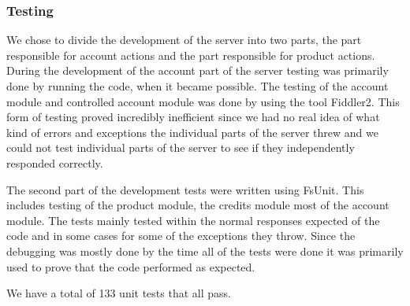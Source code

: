 \subsubsection{Testing}
We chose to divide the development of the server into two parts, the part responsible for account actions and the part responsible for product actions. During the development of the account part of the server testing was primarily done by running the code, when it became possible. The testing of the account module and controlled account module was done by using the tool Fiddler2. This form of testing proved incredibly inefficient since we had no real idea of what kind of errors and exceptions the individual parts of the server threw and we could not test individual parts of the server to see if they independently responded correctly.

The second part of the development tests were written using FsUnit. This includes testing of the product module, the credits module most of the account module. The tests mainly tested within the normal responses expected of the code and in some cases for some of the exceptions they throw. Since the debugging was mostly done by the time all of the tests were done it was primarily used to prove that the code performed as expected.

We have a total of 133 unit tests that all pass.